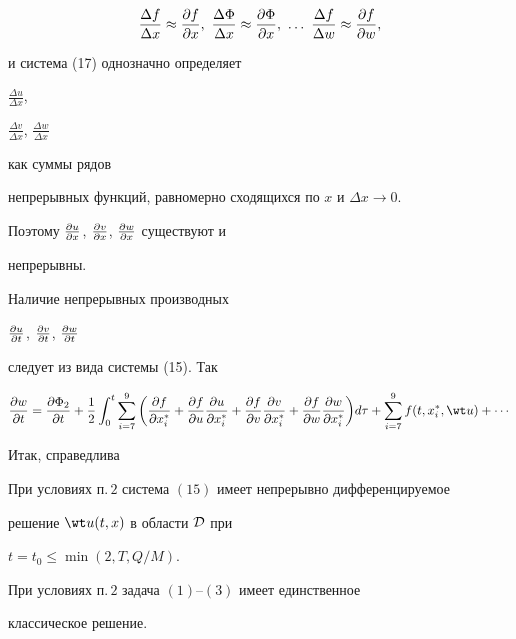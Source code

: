 $$ 


\frac{\Delta f}{\Delta x}\approx\myfrac{f}{x}, 


\ \frac{\Delta\Phi}{\Delta x}\approx\myfrac{\Phi}{x}, 


\ \dotsc \ \frac{\Delta f}{\Delta w}\approx\myfrac{f}{w},


$$ 


и система (17) однозначно определяет 


$\frac{\Delta u}{\Delta x}$, 


$\frac{\Delta v}{\Delta x}$, $\frac{\Delta w}{\Delta x}$ 


как суммы рядов 


непрерывных функций, равномерно сходящихся по $x$ и $\Delta x\to 0$. 


Поэтому $\frac{\partial u}{\partial x}$, $\frac{\partial v}{\partial x}$, $\frac{\partial w}{\partial x}$ существуют и 


непрерывны. 


 


Наличие непрерывных производных  


$\frac{\partial u}{\partial t}$, $\frac{\partial v}{\partial t}$, $\frac{\partial w}{\partial t}$  


следует из вида системы (15). Так


$$ 


\myfrac{w}{t}=\myfrac{\Phi_2}{t}+\frac{1}{2}\int^t_0 


\sum^9_{i=7}\bigg(\myfrac{f}{x^*_i}+ 


\myfrac{f}{u}\myfrac{u}{x^*_i}+ 


\myfrac{f}{v}\myfrac{v}{x^*_i}+ 


\myfrac{f}{w}\myfrac{w}{x^*_i}\bigg)d\tau+\sum^9_{i=7} 


f(t,x^*_i,\wt u)+\dotsb


$$ 


Итак, справедлива 


 


\begin{thm} 


При условиях п.\,$2$ система $(15)$ имеет непрерывно дифференцируемое 


решение $\wt u(t,x)$ в области $\cal D$ при 


$t=t_0\le\min(2,T,Q/M)$. 


\end{thm} 


 


\begin{thm} 


При условиях п.\,$2$ задача $(1)$--$(3)$ имеет единственное 


классическое решение. 


\end{thm} 


